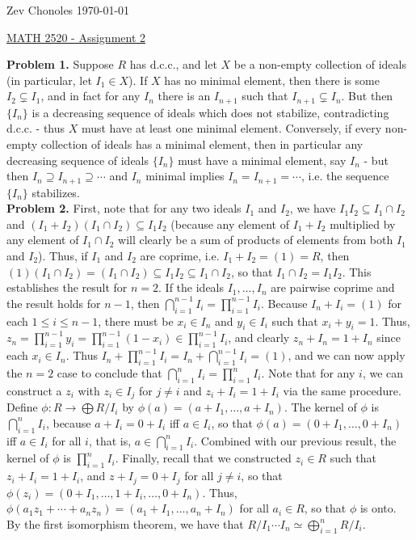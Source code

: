 \documentclass[11pt]{article}
\newcommand{\num}[1]{\noindent \textbf{#1}}
\theoremstyle{definition}
\begin{document}
\noindent Zev Chonoles \hfill \today\\[-0.4in]
\begin{center}
\noindent \underline{MATH 2520 - Assignment 2}
\end{center}

\num{Problem 1.} Suppose $R$ has d.c.c., and let $X$ be a non-empty collection of ideals (in particular, let $I_1\in X$). If $X$ has no minimal element, then there is some $I_2\subsetneq I_1$, and in fact for any $I_n$ there is an $I_{n+1}$ such that $I_{n+1}\subsetneq I_n$. But then $\{I_n\}$ is a decreasing sequence of ideals which does not stabilize, contradicting d.c.c. - thus $X$ must have at least one minimal element. Conversely, if every non-empty collection of ideals has a minimal element, then in particular any decreasing sequence of ideals $\{I_n\}$ must have a minimal element, say $I_n$ - but then $I_n\supseteq I_{n+1}\supseteq \cdots$ and $I_n$ minimal implies $I_n=I_{n+1}=\cdots$, i.e. the sequence $\{I_n\}$ stabilizes.    \\

\num{Problem 2.} First, note that for any two ideals $I_1$ and $I_2$, we have $I_1I_2\subseteq I_1\cap I_2$ and $(I_1+I_2)(I_1\cap I_2)\subseteq I_1I_2$ (because any element of $I_1+I_2$ multiplied by any element of $I_1\cap I_2$ will clearly be a sum of products of elements from both $I_1$ and $I_2$). Thus, if $I_1$ and $I_2$ are coprime, i.e. $I_1+I_2=(1)=R$, then $(1)(I_1\cap I_2)=(I_1\cap I_2)\subseteq I_1I_2\subseteq I_1\cap I_2$, so that $I_1\cap I_2=I_1I_2$. This establishes the result for $n=2$. If the ideals $I_1,\ldots,I_n$ are pairwise coprime and the result holds for $n-1$, then $\bigcap_{i=1}^{n-1} I_i=\prod_{i=1}^{n-1}I_i$.  Because $I_n+I_i=(1)$ for each $1\leq i\leq n-1$, there must be $x_i\in I_n$ and $y_i\in I_i$ such that $x_i+y_i=1$. Thus, $z_n=\prod_{i=1}^{n-1}y_i=\prod_{i=1}^{n-1}(1-x_i)\in \prod_{i=1}^{n-1} I_i$, and clearly $z_n+I_n=1+I_n$ since each $x_i\in I_n$. Thus $I_n+\prod_{i=1}^{n-1}I_i=I_n+\bigcap_{i=1}^{n-1}I_i=(1)$, and we can now apply the $n=2$ case to conclude that $\bigcap_{i=1}^n I_i=\prod_{i=1}^n I_i$. Note that for any $i$, we can construct a $z_i$ with $z_i\in I_j$ for $j\neq i$ and $z_i+I_i=1+I_i$ via the same procedure.\\

\noindent Define $\phi:R\rightarrow\bigoplus R/I_i$ by $\phi(a)=(a+I_1,\ldots,a+I_n)$. The kernel of $\phi$ is $\bigcap_{i=1}^n I_i$, because $a+I_i=0+I_i$ iff $a\in I_i$, so that $\phi(a)=(0+I_1,\ldots,0+I_n)$ iff $a\in I_i$ for all $i$, that is, $a\in\bigcap_{i=1}^n I_i$. Combined with our previous result, the kernel of $\phi$ is $\prod_{i=1}^n I_i$. Finally, recall that we constructed $z_i\in R$ such that $z_i+I_i=1+I_i$, and $z+I_j=0+I_j$ for all $j\neq i$, so that $\phi(z_i)=(0+I_1,\ldots,1+I_{i},\ldots,0+I_n)$. Thus, $\phi(a_1z_1+\cdots+a_nz_n)=(a_1+I_1,\ldots,a_n+I_n)$ for all $a_i\in R$, so that $\phi$ is onto. By the first isomorphism theorem, we have that $R/I_1\cdots I_n\simeq \bigoplus_{i=1}^nR/I_i$.   \\
\end{document}
